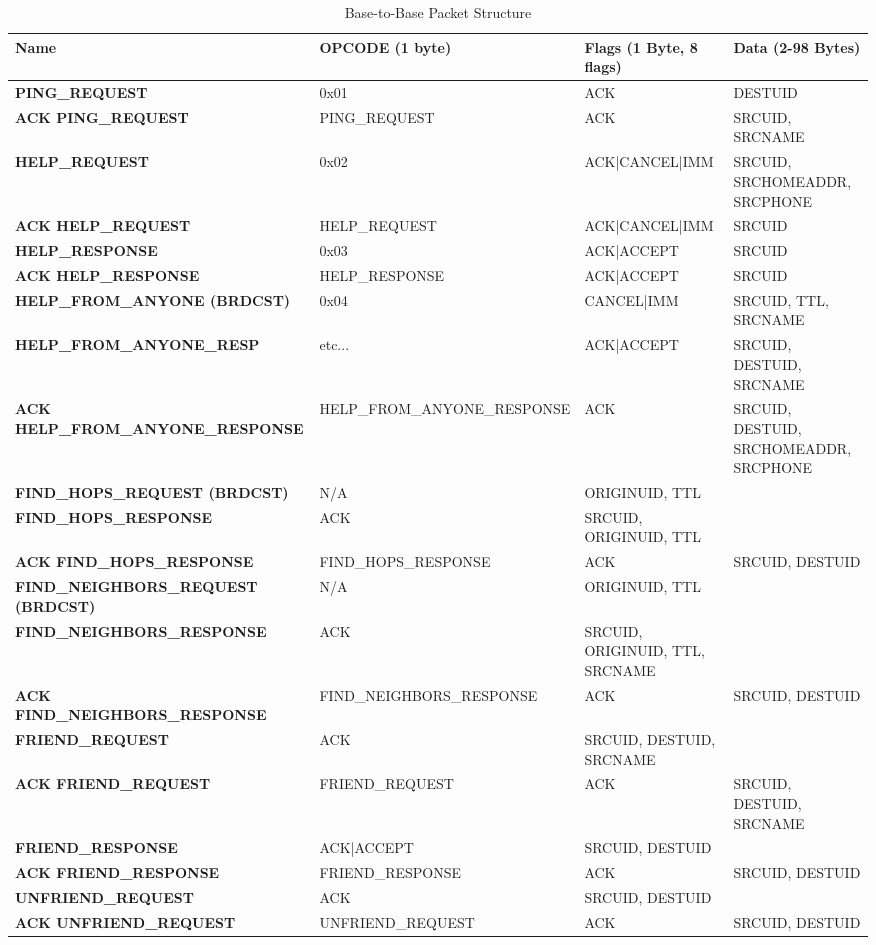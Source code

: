 \documentclass[journal,compsoc]{IEEEtran}
\begin{document}
\begin{table*}[t]
  \centering
  \begin{tabular}{>{\bfseries}l|l l l}
    Name & OPCODE (1 byte) & Flags (1 Byte, 8 flags) & Data (2-98 Bytes) \\
    \hline
    PING\_REQUEST & 0x01 & ACK & DESTUID \\
    ACK PING\_REQUEST & PING\_REQUEST & ACK & SRCUID, SRCNAME \\
    HELP\_REQUEST & 0x02 & ACK|CANCEL|IMM & SRCUID, SRCHOMEADDR, SRCPHONE \\
    ACK HELP\_REQUEST & HELP\_REQUEST & ACK|CANCEL|IMM & SRCUID \\
    HELP\_RESPONSE & 0x03 & ACK|ACCEPT & SRCUID \\
    ACK HELP\_RESPONSE & HELP\_RESPONSE & ACK|ACCEPT & SRCUID \\
    HELP\_FROM\_ANYONE (BRDCST) & 0x04 & CANCEL|IMM & SRCUID, TTL, SRCNAME \\
    HELP\_FROM\_ANYONE\_RESP & etc... & ACK|ACCEPT & SRCUID, DESTUID, SRCNAME \\
    ACK HELP\_FROM\_ANYONE\_RESPONSE & HELP\_FROM\_ANYONE\_RESPONSE & ACK & SRCUID, DESTUID, SRCHOMEADDR, SRCPHONE \\
    FIND\_HOPS\_REQUEST (BRDCST) & N/A & ORIGINUID, TTL \\
    FIND\_HOPS\_RESPONSE & ACK & SRCUID, ORIGINUID, TTL \\
    ACK FIND\_HOPS\_RESPONSE & FIND\_HOPS\_RESPONSE & ACK & SRCUID, DESTUID \\
    FIND\_NEIGHBORS\_REQUEST (BRDCST) & N/A & ORIGINUID, TTL \\
    FIND\_NEIGHBORS\_RESPONSE & ACK & SRCUID, ORIGINUID, TTL, SRCNAME \\
    ACK FIND\_NEIGHBORS\_RESPONSE & FIND\_NEIGHBORS\_RESPONSE & ACK & SRCUID, DESTUID \\
    FRIEND\_REQUEST & ACK & SRCUID, DESTUID, SRCNAME \\
    ACK FRIEND\_REQUEST & FRIEND\_REQUEST & ACK & SRCUID, DESTUID, SRCNAME \\
    FRIEND\_RESPONSE & ACK|ACCEPT & SRCUID, DESTUID \\
    ACK FRIEND\_RESPONSE & FRIEND\_RESPONSE & ACK & SRCUID, DESTUID \\
    UNFRIEND\_REQUEST & ACK & SRCUID, DESTUID \\
    ACK UNFRIEND\_REQUEST & UNFRIEND\_REQUEST & ACK & SRCUID, DESTUID
  \end{tabular} \linebreak
  \caption {Base-to-Base Packet Structure}
\end{table*}
\end{document}

